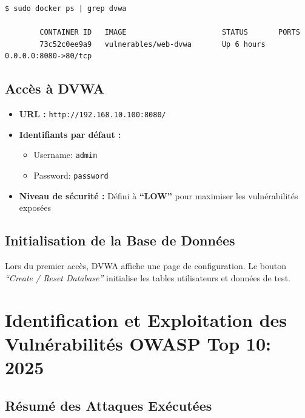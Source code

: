 \documentclass[12pt,a4paper,openany]{report}
\begin{document}
	\begin{lstlisting}[caption=Vérification du Conteneur]
		$ sudo docker ps | grep dvwa
		
		CONTAINER ID   IMAGE                      STATUS       PORTS
		73c52c0ee9a9   vulnerables/web-dvwa       Up 6 hours   0.0.0.0:8080->80/tcp
	\end{lstlisting}
	
	\section{Accès à DVWA}
	
	\begin{itemize}
		\item \textbf{URL :} \texttt{http://192.168.10.100:8080/}
		\item \textbf{Identifiants par défaut :}
		\begin{itemize}
			\item Username: \texttt{admin}
			\item Password: \texttt{password}
		\end{itemize}
		\item \textbf{Niveau de sécurité :} Défini à \textbf{``LOW''} pour maximiser les vulnérabilités exposées
	\end{itemize}
	
	\section{Initialisation de la Base de Données}
	
	Lors du premier accès, DVWA affiche une page de configuration. Le bouton 
	\textit{``Create / Reset Database''} initialise les tables utilisateurs et données de test.
	
	
	\chapter{Identification et Exploitation des Vulnérabilités OWASP Top 10: 2025}
	
	\section{Résumé des Attaques Exécutées}
	
\end{document}
